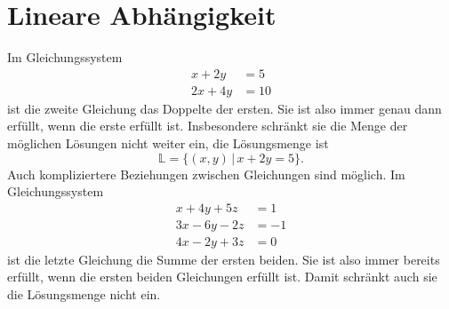 %
%
%
\section{Lineare Abhängigkeit%
\label{skript:section:linabh}}
Im Gleichungssystem
\begin{align*}
x+2y&=5\\
2x+4y&=10
\end{align*}
ist die zweite Gleichung das Doppelte der ersten.
Sie ist also immer genau dann erfüllt, wenn die erste erfüllt ist.
Insbesondere schränkt sie die Menge der möglichen Lösungen
nicht weiter ein, die Lösungsmenge ist
\[
\mathbb L=\{(x,y)\,|\, x+2y=5\}.
\]
Auch kompliziertere Beziehungen zwischen Gleichungen sind
möglich.
Im Gleichungssystem
\begin{align*}
 x+4y+5z&=1\\
3x-6y-2z&=-1\\
4x-2y+3z&=0
\end{align*}
ist die letzte Gleichung die Summe der ersten beiden.
Sie ist also
immer bereits erfüllt, wenn die ersten beiden Gleichungen erfüllt
ist.
Damit schränkt auch sie die Lösungsmenge nicht ein.

